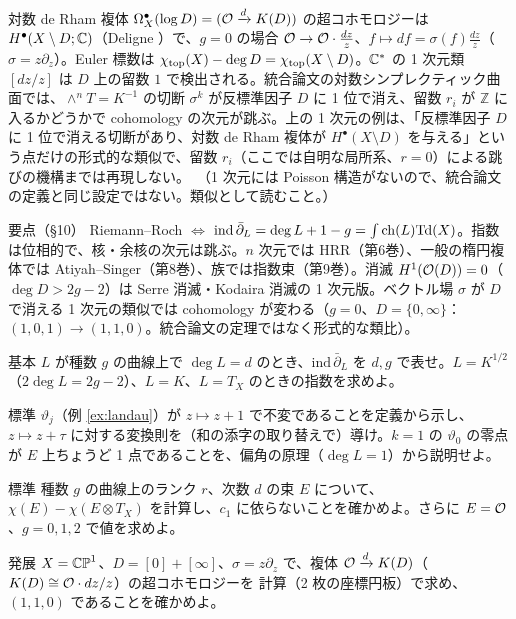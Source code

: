 対数 de Rham 複体 $\Omega^\bullet_X(\log D)=(\mathcal O\xrightarrow{d}K(D))$ の超コホモロジーは $H^\bullet(X\setminus D;\mathbb C)$（Deligne \tC）で、$g=0$ の場合 $\mathcal O\to\mathcal O\cdot\frac{dz}z$、$f\mapsto df=\sigma(f)\frac{dz}z$（$\sigma=z\partial_z$）。Euler 標数は $\chi_{\rm top}(X)-\deg D=\chi_{\rm top}(X\setminus D)$。$\mathbb C^*$ の 1 次元類 $[dz/z]$ は $D$ 上の留数 $1$ で検出される。統合論文の対数シンプレクティック曲面では、$\wedge^nT=K^{-1}$ の切断 $\sigma^k$ が反標準因子 $D$ に 1 位で消え、留数 $r_i$ が $\mathbb Z$ に入るかどうかで cohomology の次元が跳ぶ。上の 1 次元の例は、「反標準因子 $D$ に 1 位で消える切断があり、対数 de Rham 複体が $H^\bullet(X\setminus D)$ を与える」という点だけの形式的な類似で、留数 $r_i$（ここでは自明な局所系、$r=0$）による跳びの機構までは再現しない。\tQ\ （1 次元には Poisson 構造がないので、統合論文の定義と同じ設定ではない。類似として読むこと。）

\begin{keybox}{要点（§10）}
Riemann--Roch $\iff$ $\mathrm{ind}\,\bar\partial_L=\deg L+1-g=\int\mathrm{ch}(L)\mathrm{Td}(X)$。指数は位相的で、核・余核の次元は跳ぶ。$n$ 次元では HRR（第6巻）、一般の楕円複体では Atiyah--Singer（第8巻）、族では指数束（第9巻）。消滅 $H^1(\mathcal O(D))=0$（$\deg D>2g-2$）は Serre 消滅・Kodaira 消滅の 1 次元版。ベクトル場 $\sigma$ が $D$ で消える 1 次元の類似では cohomology が変わる（$g=0$、$D=\{0,\infty\}$：$(1,0,1)\to(1,1,0)$。統合論文の定理ではなく形式的な類比）。
\end{keybox}

\begin{prob}{基本}\label{p:index}
$L$ が種数 $g$ の曲線上で $\deg L=d$ のとき、$\mathrm{ind}\,\bar\partial_L$ を $d,g$ で表せ。$L=K^{1/2}$（$2\deg L=2g-2$）、$L=K$、$L=T_X$ のときの指数を求めよ。
\end{prob}
\begin{prob}{標準}\label{p:landau}
$\vartheta_j$（例 \ref{ex:landau}）が $z\mapsto z+1$ で不変であることを定義から示し、$z\mapsto z+\tau$ に対する変換則を（和の添字の取り替えで）導け。$k=1$ の $\vartheta_0$ の零点が $E$ 上ちょうど 1 点であることを、偏角の原理（$\deg L=1$）から説明せよ。
\end{prob}
\begin{prob}{標準}\label{p:euler1}
種数 $g$ の曲線上のランク $r$、次数 $d$ の束 $E$ について、$\chi(E)-\chi(E\otimes T_X)$ を計算し、$c_1$ に依らないことを確かめよ。さらに $E=\mathcal O$、$g=0,1,2$ で値を求めよ。
\end{prob}
\begin{prob}{発展}\label{p:logdr}
$X=\mathbb{CP}^1$、$D=[0]+[\infty]$、$\sigma=z\partial_z$ で、複体 $\mathcal O\xrightarrow{d}K(D)$（$K(D)\cong\mathcal O\cdot dz/z$）の超コホモロジーを \Cech{} 計算（2 枚の座標円板）で求め、$(1,1,0)$ であることを確かめよ。
\end{prob}

